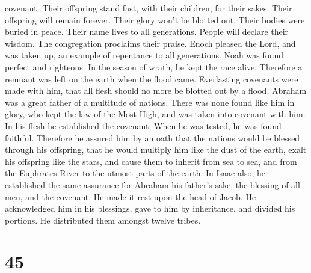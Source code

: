 covenant.  Their offspring stand fast, with their children,
for their sakes.  Their offspring will remain forever.
Their glory won't be blotted out.  Their bodies were buried
in peace. Their name lives to all generations.  People will
declare their wisdom. The congregation proclaims their praise.
 Enoch pleased the Lord, and was taken up, an example of
repentance to all generations.  Noah was found perfect and
righteous. In the season of wrath, he kept the race alive. Therefore a
remnant was left on the earth when the flood came. 
Everlasting covenants were made with him, that all flesh should no more
be blotted out by a flood.  Abraham was a great father of a
multitude of nations. There was none found like him in glory,
 who kept the law of the Most High, and was taken into
covenant with him. In his flesh he established the covenant. When he was
tested, he was found faithful.  Therefore he assured him by
an oath that the nations would be blessed through his offspring, that he
would multiply him like the dust of the earth, exalt his offspring like
the stars, and cause them to inherit from sea to sea, and from the
Euphrates River to the utmost parts of the earth.  In Isaac
also, he established the same assurance for Abraham his father's sake,
the blessing of all men, and the covenant.  He made it rest
upon the head of Jacob. He acknowledged him in his blessings, gave to
him by inheritance, and divided his portions. He distributed them
amongst twelve tribes.

\hypertarget{section-12}{%
\section{45}\label{section-12}}

